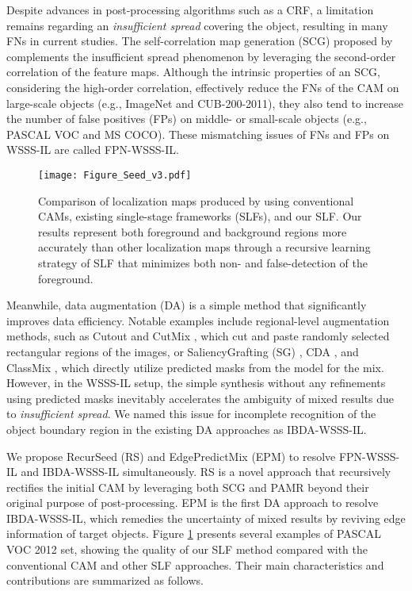 \documentclass[11pt]{article}
\begin{document}
Despite advances in post-processing algorithms such as a CRF, a limitation remains regarding an \textit{insufficient spread} covering the object, resulting in many FNs in current studies.  
{The self-correlation map generation (SCG) proposed by \citet{pan2021unveiling} complements the insufficient spread phenomenon by leveraging the second-order correlation of the feature maps.}
Although the intrinsic properties of an SCG, considering the high-order correlation, effectively reduce the FNs of the CAM on large-scale objects (e.g., ImageNet and CUB-200-2011), they also tend to increase the number of false positives (FPs) on middle- or small-scale objects (e.g., PASCAL VOC and MS COCO). These mismatching issues of FNs and FPs on WSSS-IL are called FPN-WSSS-IL. 

\begin{figure}[t]
  \centering
  \texttt{[image: Figure\_Seed\_v3.pdf]}
\caption{
      {Comparison of localization maps produced by using conventional CAMs, existing single-stage frameworks (SLFs), and our SLF.  
      Our results represent both foreground and background regions more accurately than other localization maps through a recursive learning strategy of SLF that minimizes both non- and false-detection of the  foreground.  
      } 
  }
  \label{fig:intro}


\end{figure}

{Meanwhile}, data augmentation (DA) is a simple method that significantly improves data efficiency. 
Notable examples include regional-level augmentation methods, such as Cutout \cite{devries2017improved} and CutMix \cite{yun2019cutmix}, which {cut and paste} randomly selected rectangular regions of the images, or SaliencyGrafting (SG) \cite{park2021saliency}, CDA \cite{su2021context}, and ClassMix \cite{olsson2021classmix}, which directly {utilize predicted masks from the model for the mix. However, in the WSSS-IL setup, the simple synthesis without any refinements using predicted masks inevitably accelerates the ambiguity of mixed results due to \textit{insufficient spread}}. We named this issue for {incomplete} recognition of the object boundary region in the existing DA approaches as IBDA-WSSS-IL.

{We propose RecurSeed (RS) and EdgePredictMix (EPM) to resolve FPN-WSSS-IL and IBDA-WSSS-IL simultaneously. RS is a novel approach that recursively rectifies the initial CAM by leveraging both SCG and PAMR beyond their original purpose of post-processing. EPM is the first DA approach to resolve IBDA-WSSS-IL, which remedies the uncertainty of mixed results by reviving edge information of target objects. Figure \ref{fig:intro} presents several examples of PASCAL VOC 2012  set, showing the quality of our SLF method compared with the conventional CAM and other SLF approaches.} 
Their main characteristics and contributions are summarized as follows.
\end{document}
